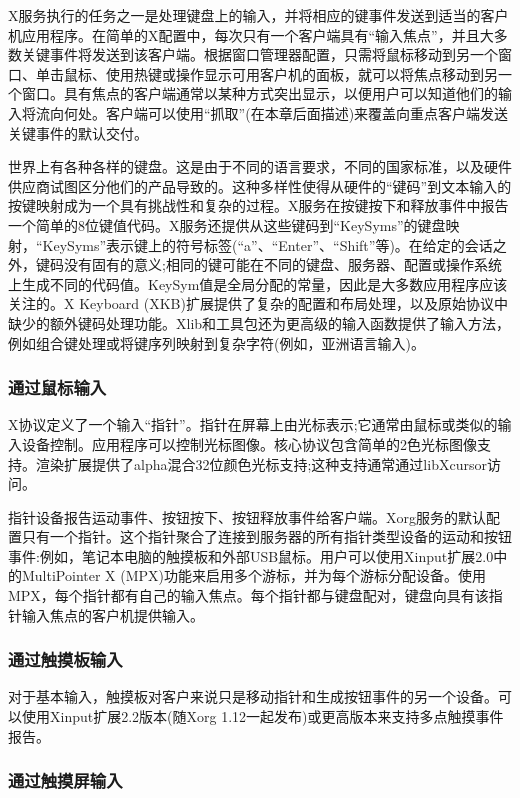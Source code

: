 X服务执行的任务之一是处理键盘上的输入，并将相应的键事件发送到适当的客户机应用程序。在简单的X配置中，每次只有一个客户端具有“输入焦点”，并且大多数关键事件将发送到该客户端。根据窗口管理器配置，只需将鼠标移动到另一个窗口、单击鼠标、使用热键或操作显示可用客户机的面板，就可以将焦点移动到另一个窗口。具有焦点的客户端通常以某种方式突出显示，以便用户可以知道他们的输入将流向何处。客户端可以使用“抓取”(在本章后面描述)来覆盖向重点客户端发送关键事件的默认交付。

世界上有各种各样的键盘。这是由于不同的语言要求，不同的国家标准，以及硬件供应商试图区分他们的产品导致的。这种多样性使得从硬件的“键码”到文本输入的按键映射成为一个具有挑战性和复杂的过程。X服务在按键按下和释放事件中报告一个简单的8位键值代码。X服务还提供从这些键码到“KeySyms”的键盘映射，“KeySyms”表示键上的符号标签(“a”、“Enter”、“Shift”等)。在给定的会话之外，键码没有固有的意义;相同的键可能在不同的键盘、服务器、配置或操作系统上生成不同的代码值。KeySym值是全局分配的常量，因此是大多数应用程序应该关注的。X Keyboard (XKB)扩展提供了复杂的配置和布局处理，以及原始协议中缺少的额外键码处理功能。Xlib和工具包还为更高级的输入函数提供了输入方法，例如组合键处理或将键序列映射到复杂字符(例如，亚洲语言输入)。

\subsubsection{通过鼠标输入}

X协议定义了一个输入“指针”。指针在屏幕上由光标表示;它通常由鼠标或类似的输入设备控制。应用程序可以控制光标图像。核心协议包含简单的2色光标图像支持。渲染扩展提供了alpha混合32位颜色光标支持;这种支持通常通过libXcursor访问。

指针设备报告运动事件、按钮按下、按钮释放事件给客户端。Xorg服务的默认配置只有一个指针。这个指针聚合了连接到服务器的所有指针类型设备的运动和按钮事件:例如，笔记本电脑的触摸板和外部USB鼠标。用户可以使用Xinput扩展2.0中的MultiPointer X (MPX)功能来启用多个游标，并为每个游标分配设备。使用MPX，每个指针都有自己的输入焦点。每个指针都与键盘配对，键盘向具有该指针输入焦点的客户机提供输入。

\subsubsection{通过触摸板输入}

对于基本输入，触摸板对客户来说只是移动指针和生成按钮事件的另一个设备。可以使用Xinput扩展2.2版本(随Xorg 1.12一起发布)或更高版本来支持多点触摸事件报告。

\subsubsection{通过触摸屏输入}


